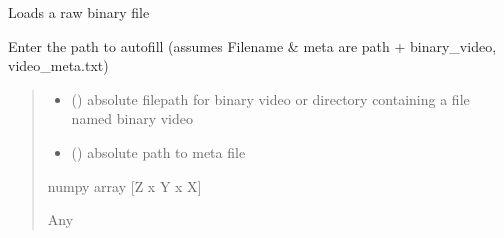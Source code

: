 \documentclass[letterpaper,10pt,english]{sphinxmanual}
\begin{document}
\begin{fulllineitems}
\label{\detokenize{CalSciPy.io:CalSciPy.io.load_raw_binary}}
\pysigstartsignatures
{}
\pysigstopsignatures
\sphinxAtStartPar
Loads a raw binary file

\sphinxAtStartPar
Enter the path to autofill (assumes Filename \& meta are path + binary\_video, video\_meta.txt)
\begin{quote}\begin{description}
\begin{itemize}
\item {} 
\sphinxAtStartPar
{} () \sphinxhyphen{}\sphinxhyphen{} absolute filepath for binary video or directory containing a file named binary video

\item {} 
\sphinxAtStartPar
{} (\sphinxstyleliteralemphasis{\sphinxupquote{{[}}}\sphinxstyleliteralemphasis{\sphinxupquote{{]}}}) \sphinxhyphen{}\sphinxhyphen{} absolute path to meta file

\end{itemize}

\sphinxAtStartPar
numpy array {[}Z x Y x X{]}

\sphinxAtStartPar
Any

\end{description}\end{quote}

\end{fulllineitems}

\end{document}

